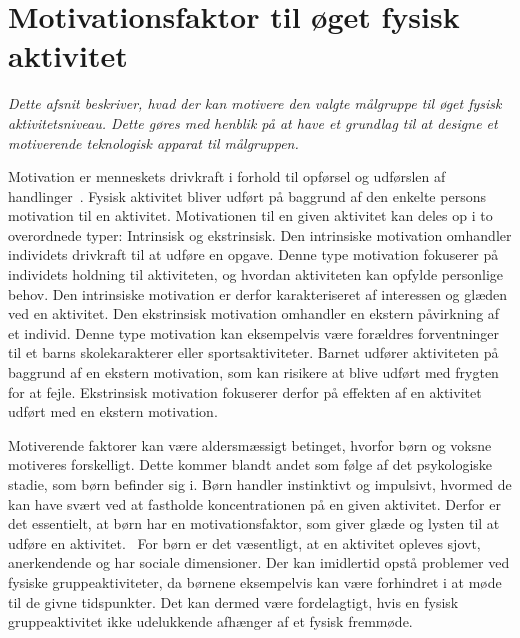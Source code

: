 \section{Motivationsfaktor til øget fysisk aktivitet}\label{motivation_boern}
\textit{Dette afsnit beskriver, hvad der kan motivere den valgte målgruppe til øget fysisk aktivitetsniveau. Dette gøres med henblik på at have et grundlag til at designe et motiverende teknologisk apparat til målgruppen.}

Motivation er menneskets drivkraft i forhold til opførsel og udførslen af handlinger~\citep{V.Brown2007}. Fysisk aktivitet bliver udført på baggrund af den enkelte persons motivation til en aktivitet. Motivationen til en given aktivitet kan deles op i to overordnede typer: Intrinsisk og ekstrinsisk. Den intrinsiske motivation omhandler individets drivkraft til at udføre en opgave. Denne type motivation fokuserer på individets holdning til aktiviteten, og hvordan aktiviteten kan opfylde personlige behov. Den intrinsiske motivation er derfor karakteriseret af interessen og glæden ved en aktivitet. Den ekstrinsisk motivation omhandler en ekstern påvirkning af et individ. Denne type motivation kan eksempelvis være forældres forventninger til et barns skolekarakterer eller sportsaktiviteter. Barnet udfører aktiviteten på baggrund af en ekstern motivation, som kan risikere at blive udført med frygten for at fejle. Ekstrinsisk motivation fokuserer derfor på effekten af en aktivitet udført med en ekstern motivation.~\citep{J.Sebire2013} 

Motiverende faktorer kan være aldersmæssigt betinget, hvorfor børn og voksne motiveres forskelligt. Dette kommer blandt andet som følge af det psykologiske stadie, som børn befinder sig i. Børn handler instinktivt og impulsivt, hvormed de kan have svært ved at fastholde koncentrationen på en given aktivitet. Derfor er det essentielt, at børn har en motivationsfaktor, som giver glæde og lysten til at udføre en aktivitet.~\citep{V.Brown2007} For børn er det væsentligt, at en aktivitet opleves sjovt, anerkendende og har sociale dimensioner. Der kan imidlertid opstå problemer ved fysiske gruppeaktiviteter, da børnene eksempelvis kan være forhindret i at møde til de givne tidspunkter. Det kan dermed være fordelagtigt, hvis en fysisk gruppeaktivitet ikke udelukkende afhænger af et fysisk fremmøde.~\citep{Wied2011,Romani2013}

